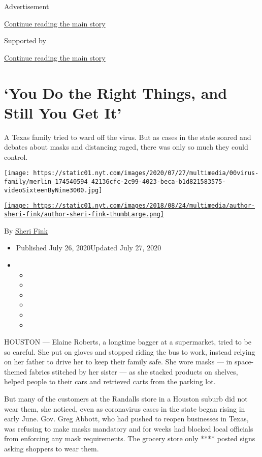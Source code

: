 Advertisement

\protect\hyperlink{after-top}{Continue reading the main story}

Supported by

\protect\hyperlink{after-sponsor}{Continue reading the main story}

\hypertarget{you-do-the-right-things-and-still-you-get-it}{%
\section{`You Do the Right Things, and Still You Get
It'}\label{you-do-the-right-things-and-still-you-get-it}}

A Texas family tried to ward off the virus. But as cases in the state
soared and debates about masks and distancing raged, there was only so
much they could control.

\texttt{[image: https://static01.nyt.com/images/2020/07/27/multimedia/00virus-family/merlin\_174540594\_42136cfc-2c99-4023-beca-b1d821583575-videoSixteenByNine3000.jpg]}

\href{https://www.nytimes.com/by/sheri-fink}{\texttt{[image: https://static01.nyt.com/images/2018/08/24/multimedia/author-sheri-fink/author-sheri-fink-thumbLarge.png]}}

By \href{https://www.nytimes.com/by/sheri-fink}{Sheri Fink}

\begin{itemize}
\item
  Published July 26, 2020Updated July 27, 2020
\item
  \begin{itemize}
  \item
  \item
  \item
  \item
  \item
  \item
  \end{itemize}
\end{itemize}

HOUSTON --- Elaine Roberts, a longtime bagger at a supermarket, tried to
be so careful. She put on gloves and stopped riding the bus to work,
instead relying on her father to drive her to keep their family safe.
She wore masks --- in space-themed fabrics stitched by her sister --- as
she stacked products on shelves, helped people to their cars and
retrieved carts from the parking lot.

But many of the customers at the Randalls store in a Houston suburb did
not wear them, she noticed, even as coronavirus cases in the state began
rising in early June. Gov. Greg Abbott, who had pushed to reopen
businesses in Texas, was refusing to make masks mandatory and for weeks
had blocked local officials from enforcing any mask requirements. The
grocery store only **** posted signs asking shoppers to wear them.

